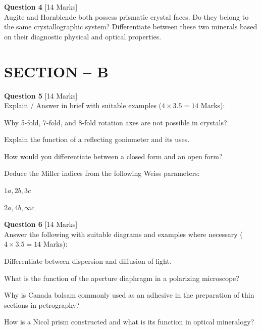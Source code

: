 \documentclass[11pt,a4paper]{article}
\begin{document}
\bigskip




\noindent   \textbf{Question 4} \hfill [14 Marks]\\
Augite and Hornblende both possess prismatic crystal faces. Do they belong to the same crystallographic system? Differentiate between these two minerals based on their diagnostic physical and optical properties.

\bigskip
\section*{SECTION -- B}




\noindent   \textbf{Question 5} \hfill [14 Marks]\\
Explain / Answer in brief with suitable examples ($4  \times 3.5 = 14$ Marks):

\begin{parts}
  \item Why 5-fold, 7-fold, and 8-fold rotation axes are not possible in crystals?
  \item Explain the function of a reflecting goniometer and its uses.
  \item How would you differentiate between a closed form and an open form?
  \item Deduce the Miller indices from the following Weiss parameters:
  
\begin{romanlist}
    \item $1a, 2b, 3c$
    \item $2a, 4b, \infty c$
  \end{romanlist}
\end{parts}

\bigskip




\noindent   \textbf{Question 6} \hfill [14 Marks]\\
Answer the following with suitable diagrams and examples where necessary ($4  \times 3.5 = 14$ Marks):

\begin{parts}
  \item Differentiate between dispersion and diffusion of light.
  \item What is the function of the aperture diaphragm in a polarizing microscope?
  \item Why is Canada balsam commonly used as an adhesive in the preparation of thin sections in petrography?
  \item How is a Nicol prism constructed and what is its function in optical mineralogy?
\end{parts}
\end{document}
